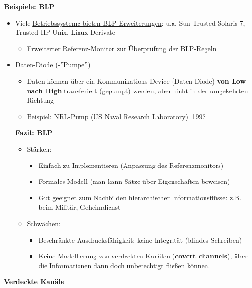 \documentclass[openany]{book}
\begin{document}
\textbf{Beispiele: BLP}
\begin{itemize}
\item Viele \underline{Betriebssysteme bieten BLP-Erweiterungen}: u.a. Sun Trusted Solaris 7, Trusted HP-Unix, Linux-Derivate
\begin{itemize}
\item Erweiterter Referenz-Monitor zur Überprüfung der BLP-Regeln
\end{itemize}
\item Daten-Diode (-''Pumpe'')
\begin{itemize}
\item Daten können über ein Kommunikations-Device (Daten-Diode) \textbf{von Low nach High} transferiert (gepumpt) werden, aber nicht in der umgekehrten Richtung 
\item Beispiel: NRL-Pump (US Naval Research Laboratory), 1993
\end{itemize}

\textbf{Fazit: BLP}

\begin{itemize}
\item Stärken:
\begin{itemize}
\item Einfach zu Implementieren (Anpassung des Referenzmonitors)
\item Formales Modell (man kann Sätze über Eigenschaften beweisen)
\item Gut geeignet zum \underline{Nachbilden hierarchischer Informationsflüsse:} z.B. beim Militär, Geheimdienst
\end{itemize}
\item Schwächen:
\begin{itemize}
\item Beschränkte Ausdrucksfähigkeit: keine Integrität (blindes Schreiben)
\item Keine Modellierung von verdeckten Kanälen (\textbf{covert channels}), über die Informationen dann doch unberechtigt fließen können.
\end{itemize}
\end{itemize}
\end{itemize}

\textbf{Verdeckte Kanäle}
\end{document}
